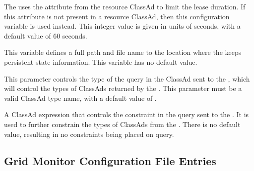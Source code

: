 \begin{description}
\label{param:LeaseManager.DefaultMaxLeaseDuration}
\item[\Macro{LeaseManager.DEFAULT\_MAX\_LEASE\_DURATION}]
  The  uses the
   attribute from the resource ClassAd to limit the
  lease duration.  If this attribute is not present in a resource
  ClassAd, then this configuration variable is used instead.
  This integer value is given in units of seconds,
  with a default value of 60 seconds.

\label{param:LeaseManager.ClassadLog}
\item[\Macro{LeaseManager.CLASSAD\_LOG}]
  This variable defines a full path and file name to the location
  where the  keeps persistent state information.
  This variable has no default value.

\label{param:LeaseManager.QueryAdtype}
\item[\Macro{LeaseManager.QUERY\_ADTYPE}]
  This parameter controls the type of the query in the ClassAd sent to
  the , which will control the types of ClassAds
  returned by the .  This parameter must be a valid
  ClassAd type name, with a default value of .

\label{param:LeaseManager.QueryConstraints}
\item[\Macro{LeaseManager.QUERY\_CONSTRAINTS}]
  A ClassAd expression that controls the constraint in the query sent to the
  .
  It is used to further constrain the types
  of ClassAds from the .
  There is no default value, resulting in no constraints being placed on query.

\end{description}

\subsection{\label{sec:GridMonitor-Config-File-Entries}Grid Monitor
Configuration File Entries}

